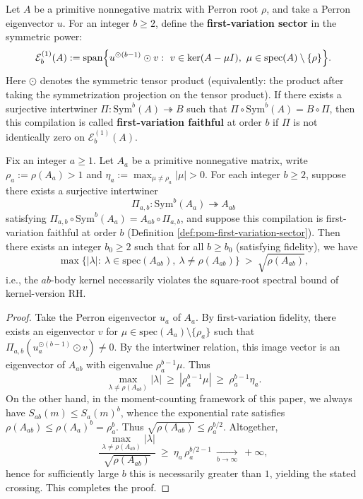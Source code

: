 \begin{definition}\label{def:pom-first-variation-sector}
Let \(A\) be a primitive nonnegative matrix with Perron root \(\rho\), and take a Perron eigenvector \(u\).
For an integer \(b\ge 2\), define the \textbf{first-variation sector} in the symmetric power:
\[
\mathcal{E}^{(1)}_{b}(A):=
\mathrm{span}\Bigl\{u^{\odot(b-1)}\odot v:\ v\in \ker(A-\mu I),\ \mu\in\mathrm{spec}(A)\setminus\{\rho\}\Bigr\}.
\]
Here \(\odot\) denotes the symmetric tensor product (equivalently: the product after taking the symmetrization projection on the tensor product).
If there exists a surjective intertwiner \(\Pi:\mathrm{Sym}^b(A)\twoheadrightarrow B\) such that \(\Pi\circ \mathrm{Sym}^b(A)=B\circ\Pi\),
then this compilation is called \textbf{first-variation faithful} at order \(b\) if \(\Pi\) is not identically zero on \(\mathcal{E}^{(1)}_{b}(A)\).
\end{definition}

\begin{theorem}[First-variation fidelity \texorpdfstring{$\Rightarrow$}{=>} high-order kernel-version RH impossibility: fatal amplification under MOM multiplicative lifting]\label{thm:pom-first-variation-fidelity-rh-breaking}
Fix an integer \(a\ge 1\).
Let \(A_a\) be a primitive nonnegative matrix, write \(\rho_a:=\rho(A_a)>1\) and \(\eta_a:=\max_{\mu\ne\rho_a}|\mu|>0\).
For each integer \(b\ge 2\), suppose there exists a surjective intertwiner
\[
\Pi_{a,b}:\mathrm{Sym}^b(A_a)\twoheadrightarrow A_{ab}
\]
satisfying \(\Pi_{a,b}\circ \mathrm{Sym}^b(A_a)=A_{ab}\circ \Pi_{a,b}\), and suppose this compilation is first-variation faithful at order \(b\) (Definition \ref{def:pom-first-variation-sector}).
Then there exists an integer \(b_0\ge 2\) such that for all \(b\ge b_0\) (satisfying fidelity), we have
\[
\max\bigl\{|\lambda|:\ \lambda\in\mathrm{spec}(A_{ab}),\ \lambda\ne\rho(A_{ab})\bigr\}\ >\ \sqrt{\rho(A_{ab})},
\]
i.e., the \(ab\)-body kernel necessarily violates the square-root spectral bound of kernel-version RH.
\end{theorem}
\begin{proof}
Take the Perron eigenvector \(u_a\) of \(A_a\). By first-variation fidelity, there exists an eigenvector \(v\) for \(\mu\in\mathrm{spec}(A_a)\setminus\{\rho_a\}\) such that
\(\Pi_{a,b}(u_a^{\odot(b-1)}\odot v)\ne 0\).
By the intertwiner relation, this image vector is an eigenvector of \(A_{ab}\) with eigenvalue \(\rho_a^{b-1}\mu\).
Thus
\[
\max_{\lambda\ne\rho(A_{ab})}|\lambda|
\ \ge\
|\rho_a^{b-1}\mu|
\ \ge\
\rho_a^{b-1}\eta_a.
\]
On the other hand, in the moment-counting framework of this paper, we always have \(S_{ab}(m)\le S_a(m)^b\), whence the exponential rate satisfies
\(\rho(A_{ab})\le \rho(A_a)^b=\rho_a^b\).
Thus
\(
\sqrt{\rho(A_{ab})}\le \rho_a^{b/2}
\).
Altogether,
\[
\frac{\max_{\lambda\ne\rho(A_{ab})}|\lambda|}{\sqrt{\rho(A_{ab})}}
\ \ge\
\eta_a\,\rho_a^{b/2-1}\ \xrightarrow[b\to\infty]{}\ +\infty,
\]
hence for sufficiently large \(b\) this is necessarily greater than \(1\), yielding the stated crossing. This completes the proof.
\end{proof}

